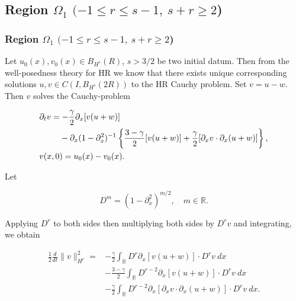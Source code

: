 \documentclass{beamer}
\numberwithin{equation}{section}
\newcommand{\rr}{\mathbb{R}}
\newcommand{\p}{\partial}
\begin{document}
\subsection{Region $\Omega_{1}$ $(-1 \le r \le s-1, \ s + r \ge 2$)} 
\begin{frame}


\frametitle{Region $\Omega_{1}$ $(-1 \le r \le s-1, \ s + r \ge 2$)} 

Let $u_{0}(x), v_{0}(x)
\in B_{H^{s}}(R)$, $s > 3/2$ be two initial datum. Then from
the well-posedness theory for HR  we
know that there exists unique corresponding solutions $u, v \in C(I,
B_{H^{s}}(2R))$ to the HR Cauchy problem.
Set $v=u-w$. Then $v$ solves the Cauchy-problem

\pause
\begin{align*}
& \p_t v
=  -\frac{\gamma}{2} \p_x [v(u + w)] 
\\
\notag
& \phantom{\p_t v = }-\p_x (1 - \p_{x}^{2})^{-1} \left\{
\frac{3-\gamma}{2}[v(u+w)] + \frac{\gamma}{2}[\p_x v \cdot \p_x (u+w)]
\right\},
\\
& v(x,0) = u_{0}(x) - v_{0}(x).
\end{align*}
\end{frame}

\begin{frame}
Let

\begin{equation*}
    D^{m} = (1 - \p_x^2)^{m/2}, \quad m \in \rr.
\end{equation*}

Applying $D^r$ to both sides then 
multiplying both sides by $D^r v$ and integrating, we obtain


\begin{equation*}
\begin{split}
 \frac{1}{2} \frac{d}{dt} \|v\|_{H^r}^2
 = & -\frac{\gamma}{2} \int_{\rr} D^r \p_x [v(u+w)] \cdot
D^r v \ dx
\\
& - \frac{3-\gamma}{2} \int_{\rr}  D^{r -2}
\p_x[v(u+w)] \cdot
D^r v \ dx  
\\
& - \frac{\gamma}{2} \int_{\rr} D^{r 
-2} \p_x [ \p_x v
\cdot \p_x (u+w)]\cdot D^r v \ dx.
\label{2v}
\end{split}
\end{equation*}
\end{frame}
\end{document}
